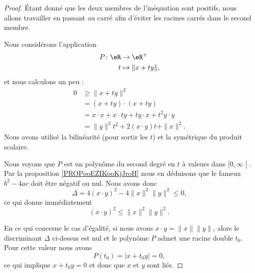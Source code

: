 \begin{proof}
	Étant donné que les deux membres de l'inéquation sont positifs, nous allons travailler en passant au carré afin d'éviter les racines carrés dans le second membre.

	Nous considérons l'application
	\begin{equation}
		\begin{aligned}
			P\colon \eR & \to \eR^+           \\
			t           & \mapsto \| x+ty \|,
		\end{aligned}
	\end{equation}
	et nous calculons un peu :
	\begin{subequations}
		\begin{align}
			0 & \geq \| x+ty \|^2                         \\
			  & =(x+ty)\cdot(x+ty)                        \\
			  & =x\cdot x+x\cdot ty+ty\cdot x+t^2y\cdot y \\
			  & =\| y \|^2t^2+2(x\cdot y)t+\| x \|^2.
		\end{align}
	\end{subequations}
	Nous avons utilisé la bilinéarité (pour sortir les \( t\)) et la symétrique du produit scalaire.

	Nous voyons que \( P\) est un polynôme du second degré en \( t\) à valeurs dans \( \mathopen[ 0 , \infty \mathclose[\). Par la proposition \ref{PROPooEZIKooKjJroH} nous en déduisons que le fameux \( b^2-4ac\) doit être négatif ou nul. Nous avons donc
	\begin{equation}
		\Delta=4(x\cdot y)^2-4\| x \|^2\| y \|^2\leq 0,
	\end{equation}
	ce qui donne immédiatement
	\begin{equation}
		(x\cdot y)^2\leq\| x \|^2\| y \|^2.
	\end{equation}

	En ce qui concerne le cas d'égalité, si nous avons \( x\cdot y=\| x \|\| y \|\), alors le discriminant \( \Delta\) ci-dessus est nul et le polynôme \( P\) admet une racine double \( t_0\). Pour cette valeur nous avons
	\begin{equation}
		P(t_0)=| x+t_0y |=0,
	\end{equation}
	ce qui implique \( x+t_0y=0\) et donc que \( x\) et \( y\) sont liés.


\end{proof}
